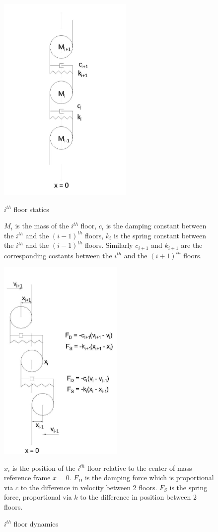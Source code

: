 \documentclass{article}
\begin{document}
				\begin{figure}[h!]
  					\centering
 				 	\begin{minipage}[b]{0.4\textwidth}
    						\includegraphics[width=65mm]{pictures/SPRINGS-Model2A.jpg}
    						\caption{$i^{th}$ floor statics}
						\medskip
						\small
						$M_i$ is the mass of the $i^{th}$ floor, $c_i$ is the damping constant between the $i^{th}$ and the $(i-1)^{th}$ floors, $k_i$ is the spring constant between the $i^{th}$ and the $(i-1)^{th}$ floors. Similarly $c_{i+1}$ and $k_{i+1}$ are the corresponding costants between the $i^{th}$ and the $(i+1)^{th}$ floors.
						\label{fig2}
  					\end{minipage}
 					 \hfill
					\begin{minipage}[b]{0.4\textwidth}
 				  	 	\includegraphics[width=60mm]{pictures/SPRINGS-Model3A.jpg}
    						\caption{$i^{th}$ floor dynamics}
						\medskip
					\small
					$x_i$ is the position of the $i^{th}$ floor relative to the center of mass reference frame $x = 0$. $F_D$ is the damping force which is proportional via $c$ to the difference in velocity between 2 floors. $F_S$ is the spring force, proportional via $k$ to the difference in position between 2 floors. 
						\label{fig3}
 					 \end{minipage}
				\end{figure}
\end{document}
